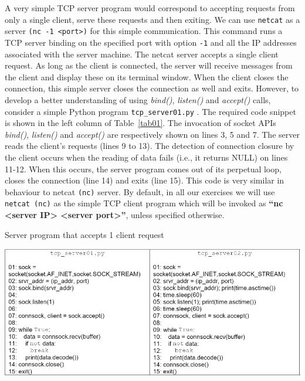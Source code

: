 \begin{multicols}{2}
A very simple TCP server program would correspond to accepting requests from only a single client, serve these requests and then exiting. We can use \texttt{netcat} as a server \texttt{(nc -1 <port>)} for this simple communication. This command runs a TCP server binding on the specified port with option \texttt{-1} and all the IP addresses associated with the server machine. The netcat server accepts a single client request. As long as the client is connected, the server will receive messages from the client and display these on its terminal window. When the client closes the connection, this simple server closes the connection as well and exits. However, to develop a better understanding of using \textit{bind()}, \textit{listen()} and \textit{accept()} calls, consider a simple Python program \texttt{tcp\_server01.py} \cite{art1-key17}. The required code snippet is shown in the left column of Table~\ref{tab01}. The invocation of socket APIs \textit{bind()}, \textit{listen()} and \textit{accept()} are respectively shown on lines 3, 5 and 7. The server reads the client’s requests (lines 9 to 13). The detection of connection closure by the client occurs when the reading of data fails (i.e., it returns NULL) on lines 11-12. When this occurs, the server program comes out of its perpetual loop, closes the connection (line 14) and exits (line 15). This code is very similar in behaviour to netcat \texttt{(nc)} server. By default, in all our exercises we will use \texttt{netcat (nc)} as the simple TCP client program which will be invoked as \textbf{“nc <server IP> <server port>”}, unless specified otherwise.
\end{multicols}

\setcounter{section}{0}
\begin{table}[H]

\vspace{-.8cm}

\centering
\caption{Server program that accepts 1 client request}\label{tab01}
\includegraphics[scale=2.25]{src/Figures/chap1/tab01.jpg}
\end{table}

